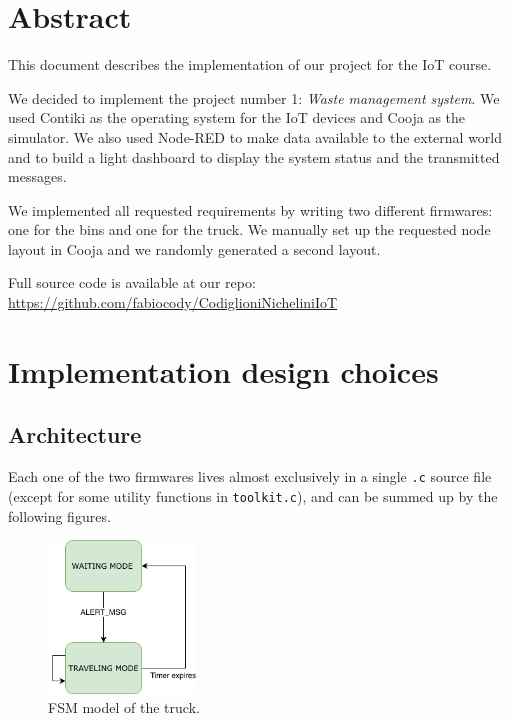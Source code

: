 \documentclass[a4paper, 11pt, parskip=half]{scrartcl}
\begin{document}
\begin{titlepage}
\vfill %

\end{titlepage}

\tableofcontents          %
\listoffigures
\newpage


\section{Abstract}
This document describes the implementation of our project for the IoT course.

We decided to implement the project number 1: \textit{Waste management system}. We used Contiki as the operating system for the IoT devices and Cooja as the simulator. We also used Node-RED to make data available to the external world and to build a light dashboard to display the system status and the transmitted messages.

We implemented all requested requirements by writing two different firmwares: one for the bins and one for the truck. We manually set up the requested node layout in Cooja and we randomly generated a second layout.

Full source code is available at our repo: \\
\url{https://github.com/fabiocody/CodiglioniNicheliniIoT}

\section{Implementation design choices}

\subsection{Architecture}

Each one of the two firmwares lives almost exclusively in a single \texttt{.c} source file (except for some utility functions in \texttt{toolkit.c}), and can be summed up by the following figures.

\begin{figure}[H]
	\centering
	\includegraphics[width=0.35\textwidth]{resources/truck_state_chart}
	\caption{FSM model of the truck.}
	\label{fig:truck-fsm}
\end{figure}
\end{document}
